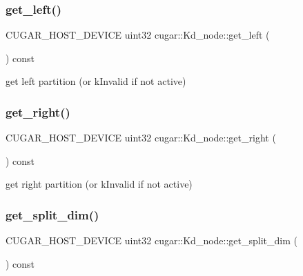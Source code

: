 \subsubsection{\texorpdfstring{get\+\_\+left()}{get\_left()}}
{\footnotesize\ttfamily C\+U\+G\+A\+R\+\_\+\+H\+O\+S\+T\+\_\+\+D\+E\+V\+I\+CE uint32 cugar\+::\+Kd\+\_\+node\+::get\+\_\+left (\begin{DoxyParamCaption}{ }\end{DoxyParamCaption}) const\hspace{0.3cm}{\ttfamily [inline]}}

get left partition (or k\+Invalid if not active) \mbox{\label{structcugar_1_1_kd__node_af589d9046f918319d562c35dfaae8ba7}} 
\subsubsection{\texorpdfstring{get\+\_\+right()}{get\_right()}}
{\footnotesize\ttfamily C\+U\+G\+A\+R\+\_\+\+H\+O\+S\+T\+\_\+\+D\+E\+V\+I\+CE uint32 cugar\+::\+Kd\+\_\+node\+::get\+\_\+right (\begin{DoxyParamCaption}{ }\end{DoxyParamCaption}) const\hspace{0.3cm}{\ttfamily [inline]}}

get right partition (or k\+Invalid if not active) \mbox{\label{structcugar_1_1_kd__node_a744e974427997c42d6399eed287d4bef}} 
\subsubsection{\texorpdfstring{get\+\_\+split\+\_\+dim()}{get\_split\_dim()}}
{\footnotesize\ttfamily C\+U\+G\+A\+R\+\_\+\+H\+O\+S\+T\+\_\+\+D\+E\+V\+I\+CE uint32 cugar\+::\+Kd\+\_\+node\+::get\+\_\+split\+\_\+dim (\begin{DoxyParamCaption}{ }\end{DoxyParamCaption}) const\hspace{0.3cm}{\ttfamily [inline]}}


